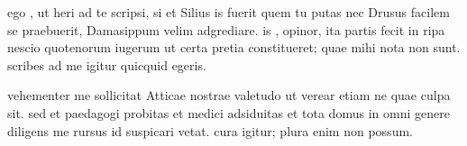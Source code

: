 


 ego , ut heri ad te scripsi, si et Silius is fuerit quem tu putas nec Drusus facilem se praebuerit, Damasippum velim adgrediare. is , opinor, ita partis fecit in ripa nescio quotenorum iugerum ut certa pretia constitueret; quae mihi nota non sunt. scribes ad me igitur quicquid egeris.

 vehementer me sollicitat Atticae nostrae valetudo ut verear etiam ne quae culpa sit. sed et paedagogi probitas et medici adsiduitas et tota domus in omni genere diligens me rursus id suspicari vetat. cura igitur; plura enim non possum.
